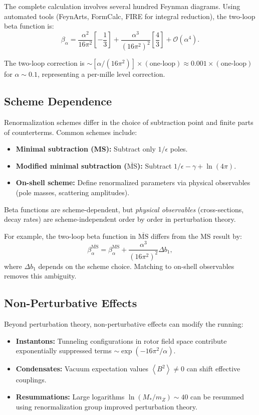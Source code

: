 \documentclass[11pt,a4paper]{article}
\numberwithin{equation}{section}
\theoremstyle{plain}
\theoremstyle{definition}
\theoremstyle{remark}
\newcommand{\avg}[1]{\left\langle #1 \right\rangle}
\begin{document}
The complete calculation involves several hundred Feynman diagrams. Using automated tools (FeynArts, FormCalc, FIRE for integral reduction), the two-loop beta function is:
\begin{equation}
\beta_\alpha = \frac{\alpha^2}{16\pi^2}\left[-\frac{1}{3}\right] + \frac{\alpha^3}{(16\pi^2)^2}\left[\frac{4}{3}\right] + \mathcal{O}(\alpha^4).
\label{eq:beta-alpha-2loop-nf3}
\end{equation}

The two-loop correction is $\sim [\alpha/(16\pi^2)]\times(\text{one-loop}) \approx 0.001\times(\text{one-loop})$ for $\alpha\sim 0.1$, representing a per-mille level correction.

\subsection{Scheme Dependence}

Renormalization schemes differ in the choice of subtraction point and finite parts of counterterms. Common schemes include:
\begin{itemize}
  \item \textbf{Minimal subtraction (MS):} Subtract only $1/\epsilon$ poles.
  \item \textbf{Modified minimal subtraction ($\overline{\text{MS}}$):} Subtract $1/\epsilon - \gamma + \ln(4\pi)$.
  \item \textbf{On-shell scheme:} Define renormalized parameters via physical observables (pole masses, scattering amplitudes).
\end{itemize}

Beta functions are scheme-dependent, but \emph{physical observables} (cross-sections, decay rates) are scheme-independent order by order in perturbation theory.

For example, the two-loop beta function in $\overline{\text{MS}}$ differs from the MS result by:
\begin{equation}
\beta_\alpha^{\overline{\text{MS}}} = \beta_\alpha^{\text{MS}} + \frac{\alpha^3}{(16\pi^2)^2}\Delta b_1,
\label{eq:beta-scheme}
\end{equation}
where $\Delta b_1$ depends on the scheme choice. Matching to on-shell observables removes this ambiguity.

\subsection{Non-Perturbative Effects}

Beyond perturbation theory, non-perturbative effects can modify the running:
\begin{itemize}
  \item \textbf{Instantons:} Tunneling configurations in rotor field space contribute exponentially suppressed terms $\sim \exp(-16\pi^2/\alpha)$.
  \item \textbf{Condensates:} Vacuum expectation values $\avg{B^2}\neq 0$ can shift effective couplings.
  \item \textbf{Resummations:} Large logarithms $\ln(M_*/m_Z)\sim 40$ can be resummed using renormalization group improved perturbation theory.
\end{itemize}
\end{document}
